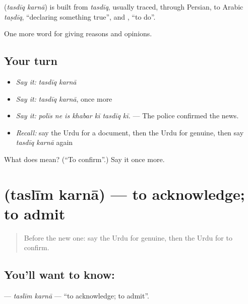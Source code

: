 \begin{cousinweb}
\textbf{ } (\emph{tasdīq karnā}) is built from \emph{tasdīq}, usually traced, through Persian, to Arabic \emph{taṣdīq}, \textquotedblleft{}declaring something true\textquotedblright{}, and \textbf{}, \textquotedblleft{}to do\textquotedblright{}.
\end{cousinweb}

\begin{grammarlens}[title={What you've built}]
One more word for giving reasons and opinions.
\end{grammarlens}

\subsection*{Your turn}
\begin{itemize}
\raggedright
  \item \emph{Say it:} \emph{tasdīq karnā}
  \item \emph{Say it:} \emph{tasdīq karnā}, once more
  \item \emph{Say it:} \emph{polīs ne is khabar kī tasdīq kī.} — The police confirmed the news.
  \item \emph{Recall:} say the Urdu for a document, then the Urdu for genuine, then say \emph{tasdīq karnā} again
\end{itemize}

\begin{tcolorbox}[breakable,colback=teal!4,colframe=teal!35!black,title={Before you move on}]
What does   mean? (\textquotedblleft{}To confirm\textquotedblright{}.) Say it once more.
\end{tcolorbox}
\section[\texorpdfstring{\ur{تسلیم} \ur{کرنا} (taslīm karnā)}{تسلیم کرنا (taslīm karnā)}]{  (taslīm karnā) — to acknowledge; to admit}

\label{lesson:UR-C337-taslim-karna}



\begin{quote}
Before the new one: say the Urdu for genuine, then the Urdu for to confirm.
\end{quote}

\subsection*{You'll want to know:  }
\textbf{ } — \emph{taslīm karnā} — \textquotedblleft{}to acknowledge; to admit\textquotedblright{}.

